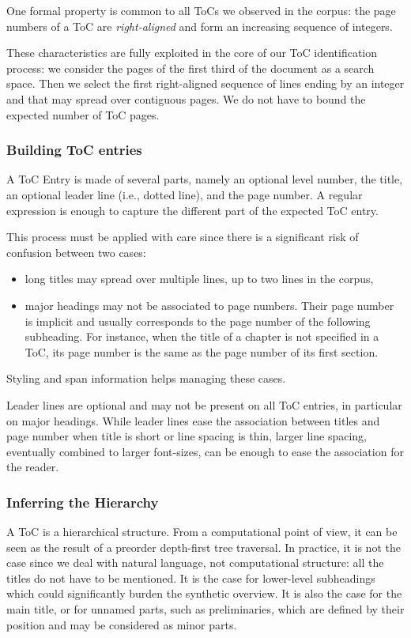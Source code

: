 One formal property is common to all ToCs we observed in the corpus:
the page numbers of a ToC are \emph{right-aligned} and form an increasing sequence of integers.

These characteristics are fully exploited in the core of our ToC identification process: we consider the pages of the first third of the document as a search space. Then we select the first right-aligned sequence of lines ending by an integer and that may spread over contiguous pages. We do not have to bound the expected number of ToC pages.

\subsubsection{Building ToC entries}

A ToC Entry is made of several parts, namely an optional level number, the title, an optional leader line (i.e., dotted line), and the page number. A regular expression is enough to capture the different part of the expected ToC entry.

This process must be applied with care since there is a significant risk of confusion between two cases: 
\begin{itemize}
    \item long titles may spread over multiple lines, up to two lines in the corpus,
    \item major headings may not be associated to page numbers. Their page number is implicit and usually corresponds to the page number of the following subheading. For instance, when the title of a chapter is not specified in a ToC, its page number is the same as the page number of its first section.
\end{itemize} 

Styling and span information helps managing these cases.

Leader lines are optional and may not be present on all ToC entries, in particular on major headings.  While leader lines ease the association between titles and page number when title is short or line spacing is thin, larger line spacing, eventually combined to larger font-sizes, can be enough to ease the association for the reader.

\subsubsection{Inferring the Hierarchy}

A ToC is a hierarchical structure. From a computational point of view, it can be seen as the result of a preorder depth-first tree traversal. In practice, it is not the case since we deal with natural language, not computational structure: all the titles do not have to be mentioned. It is the case for lower-level subheadings which could significantly burden the synthetic overview. It is also the case for the main title, or for unnamed parts, such as preliminaries, which are defined by their position and may be considered as minor parts.

